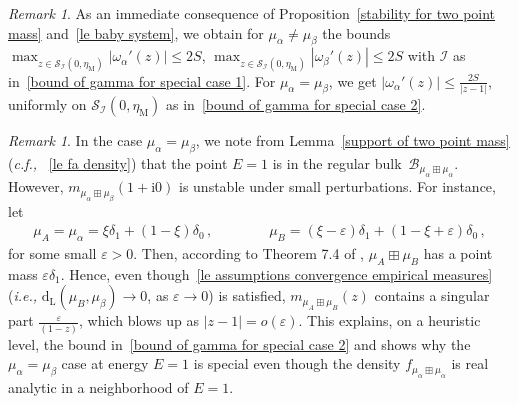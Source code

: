 \documentclass[10pt,reqno]{amsart}
\numberwithin{equation}{section}
\theoremstyle{plain}
\newcounter{kevin}
\numberwithin{kevin}{section}
\theoremstyle{remark}
\newtheorem{remark}[kevin]{Remark}
\newcommand{\ii}{\mathrm{i}}
\newcommand{\ie}{\emph{i.e., }}
\newcommand{\cf}{\emph{c.f., }}
\newcommand{\dL}{\mathrm{d}_{\mathrm{L}}}
\begin{document}
\begin{remark}
As an immediate consequence of Proposition~\ref{stability for two point mass} and~\eqref{le baby system}, we obtain for $\mu_\alpha\not=\mu_\beta$ the bounds
$\max_{z\in\mathcal{S}_{\mathcal{I}}(0,\eta_{\mathrm{M}})}|\omega_\alpha'(z)|\le 2S$, $\max_{z\in\mathcal{S}_{\mathcal{I}}(0,\eta_{\mathrm{M}})}|\omega_\beta'(z)|\le 2S$
with $\mathcal{I}$ as in~\eqref{bound of gamma for special case 1}. For $\mu_\alpha=\mu_\beta$, we get $|\omega_\alpha'(z)|\le \frac{2S}{|z-1|}$,
uniformly on $\mathcal{S}_{\mathcal{I}}(0,\eta_{\mathrm{M}})$ as in~\eqref{bound of gamma for special case 2}.
\end{remark}
\begin{remark} \label{E=1 is unstable}
In the case $\mu_\alpha=\mu_\beta$, we note from Lemma~\ref{support of two point mass} (\cf~\eqref{le fa density}) that the point $E=1$ is in the regular bulk~$\mathcal{B}_{\mu_\alpha\boxplus\mu_\alpha}$. However, $m_{\mu_\alpha\boxplus\mu_\beta}(1+\ii0)$ is unstable under small perturbations. For instance, let
 \begin{align*}
 \mu_A=\mu_\alpha=\xi\delta_1+(1-\xi)\delta_0\,,\qquad\qquad \mu_B=(\xi-\varepsilon)\delta_1+(1-\xi+\varepsilon)\delta_0\,,
 \end{align*} 
 for some small $\varepsilon>0$. Then, according to Theorem 7.4 of \cite{BeV98}, $\mu_A\boxplus\mu_B$ has a point mass $\varepsilon\delta_1$. Hence, even though~\eqref{le assumptions convergence empirical measures} (\ie $\dL(\mu_B,\mu_\beta)\rightarrow 0$, as $\varepsilon\to 0$) is satisfied, $m_{\mu_A\boxplus\mu_B}(z)$ contains a singular part $\frac{\varepsilon}{(1-z)}$, which blows up as $|z-1|= o(\varepsilon)$. This explains, on a heuristic level, the bound in~\eqref{bound of gamma for special case 2} and shows why the $\mu_\alpha=\mu_\beta$ case at energy $E=1$ is special even though the density $f_{\mu_{\alpha}\boxplus\mu_\alpha}$ is real analytic in a neighborhood of $E=1$. 
\end{remark}
\end{document}
